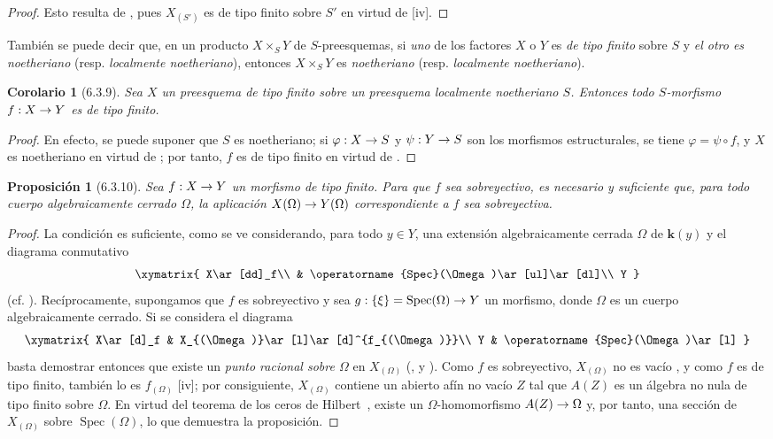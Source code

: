 \documentclass[oneside]{amsart}
\theoremstyle{ega-env-style}
\theoremstyle{ega-thm-env-style}
\newtheorem*{proposition}{Proposición}
\newtheorem*{corollary}{Corolario}
\theoremstyle{ega-defn-env-style}
\renewcommand{\to}{\mathchoice{\longrightarrow}{\rightarrow}{\rightarrow}{\rightarrow}}
\newcommand{\oldpage}[2][]{{\marginnote{\normalfont{\textbf{#1}~|~#2}}}\ignorespaces}
\let\EGAOriginalLabel\label
\renewcommand{\label}[1]{\phantomsection\EGAOriginalLabel{#1}}
\begin{document}
\begin{proof}
Esto resulta de , pues $X_{(S')}$ es de tipo finito sobre $S'$ en virtud de [iv].
\end{proof}

También se puede decir que, en un producto $X\times_S Y$ de $S$-preesquemas, si \emph{uno} de los
\oldpage[I]{147}
factores $X$ o $Y$ es \emph{de tipo finito} sobre $S$ y \emph{el otro es noetheriano} (resp. \emph{localmente noetheriano}), entonces $X\times_S Y$ es \emph{noetheriano} (resp. \emph{localmente noetheriano}).

\begin{corollary}[6.3.9]
\label{I.6.3.9}
Sea $X$ un preesquema de tipo finito sobre un preesquema localmente noetheriano $S$.
Entonces todo $S$-morfismo $f:X\to Y$ es de tipo finito.
\end{corollary}

\begin{proof}
En efecto, se puede suponer que $S$ es noetheriano;
si $\varphi:X\to S$ y $\psi:Y\to S$ son los morfismos estructurales, se tiene $\varphi=\psi\circ f$, y $X$ es noetheriano en virtud de ;
por tanto, $f$ es de tipo finito en virtud de .
\end{proof}

\begin{proposition}[6.3.10]
\label{I.6.3.10}
Sea $f:X\to Y$ un morfismo de tipo finito.
Para que $f$ sea sobreyectivo, es necesario y suficiente que, para todo cuerpo \emph{algebraicamente cerrado} $\Omega$, la aplicación $X(\Omega)\to Y(\Omega)$ correspondiente a $f$  sea sobreyectiva.
\end{proposition}

\begin{proof}
La condición es suficiente, como se ve considerando, para todo $y\in Y$, una extensión algebraicamente cerrada $\Omega$ de $\boldsymbol{k}(y)$ y el diagrama conmutativo
\[
  \xymatrix{
    X\ar[dd]_f\\
    & \operatorname{Spec}(\Omega)\ar[ul]\ar[dl]\\
    Y
  }
\]
(cf. ).
Recíprocamente, supongamos que $f$ es sobreyectivo y sea $g:\{\xi\}=\operatorname{Spec}(\Omega)\to Y$ un morfismo, donde $\Omega$ es un cuerpo algebraicamente cerrado.
Si se considera el diagrama
\[
  \xymatrix{
    X\ar[d]_f &
    X_{(\Omega)}\ar[l]\ar[d]^{f_{(\Omega)}}\\
    Y &
    \operatorname{Spec}(\Omega)\ar[l]
  }
\]
basta demostrar entonces que existe un \emph{punto racional sobre $\Omega$} en $X_{(\Omega)}$ (,  y ).
Como $f$ es sobreyectivo, $X_{(\Omega)}$ no es vacío , y como $f$ es de tipo finito, también lo es $f_{(\Omega)}$ [iv];
por consiguiente, $X_{(\Omega)}$ contiene un abierto afín no vacío $Z$ tal que $A(Z)$ es un álgebra no nula de tipo finito sobre $\Omega$.
En virtud del teorema de los ceros de Hilbert~\cite{I-21}, existe un $\Omega$-homomorfismo $A(Z)\to\Omega$ y, por tanto, una sección de $X_{(\Omega)}$ sobre $\operatorname{Spec}(\Omega)$, lo que demuestra la proposición.
\end{proof}
\end{document}
